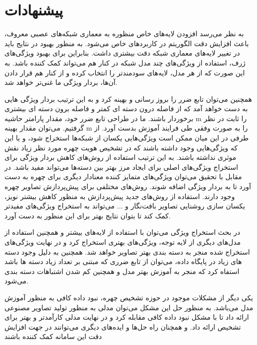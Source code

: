 \section{پیشنهادات}
به نظر می‌رسد افزودن لایه‌های خاص منظوره به معماری شبکه‌های عصبی معروف‌‌، باعث افزایش دقت الگوریتم در کاربردهای خاص می‌شود. به منظور بهبود در نتایج باید در تغییر لایه‌های معماری شبکه دقت بیشتری داشت. بنابراین برای بهبود ویژگی‌های ژرف، استفاده از ویژگی‌های چند مدل شبکه در کنار هم می‌تواند کمک کننده باشد. به این صورت که از هر مدل، لایه‌های سودمندتر را انتخاب کرده و از کنار هم قرار دادن آن‌ها، بردار ویژگی ما غنی‌تر خواهد شد. 

همچنین می‌توان تابع ضرر را بروز رسانی و بهینه ‌کرد و به این ترتیب بردار ویژگی هایی به دست خواهد آمد که از فاصله درون دسته ای کمتر و فاصله برون دسته ای بیشتری برخوردار باشند. ما در طراحی تابع ضرر خود، مقدار پارامتر حاشیه m را ثابت در نظر گرفتیم. می‌توان مقدار بهینه m را به صورت وفقی  طی فرایند آموزش بدست آورد. از طرفی در این میان ممکن است ویژگی‌هایی یکسان از شبکه‌ها استخراج شود، و یا این که ویژگی‌هایی وجود داشته باشند که در تشخیص هویت چهره مورد نظر زیاد نقش موثری نداشته باشند. به این ترتیب استفاده از روش‌های کاهش بردار ویژگی برای استخراج ویژگی‌های اصلی برای ایجاد مرز بهتر بین دسته‌ها‌ می‌تواند مفید باشد.
\noindent
در مقابل با تحقیق می‌توان ویژگی‌های متمایز کننده معنادار دیگری برای چهره به دست آورد تا به بردار ویژگی اضافه شوند. روش‌های مختلفی برای پیش‌پردازش تصاویر چهره وجود دارند. استفاده از روش‌های جدید پیش‌پردازش به منظور کاهش بیشتر نویز، یکسان‌ سازی روشنایی تصاویر بافت‌نگار و ... می‌تواند به استخراج ویژگی‌های مفیدتر کمک کند تا بتوان نتایج بهتر برای این منظور به دست آورد.

در بحث استخراج ویژگی می‌توان با استفاده از لایه‌های بیشتر و همچنین استفاده از مدل‌های دیگری از لایه توجه، ویژگی‌های بهتری استخراج كرد و در نهایت ویژگی‌های استخراج شده منجر به دسته بندی بهتر تصاویر خواهد شد. همچنین به دلیل وجود دسته های زیاد در پایگاه داده، می‌توان از تابع ضرری كه مبتنی بر تعداد زیاد دسته ها باشد استفاه كرد كه منجر به آموزش بهتر مدل و همچنین كم شدن اشتباهات دسته بندی می‌شود.

یكی دیگر از مشكلات موجود در حوزه تشخیص چهره، نبود داده كافی به منظور آموزش مدل می‌باشد. به منظور حل این مشكل می‌توان مدلی به منظور تولید تصاویر مصنوعی ارائه داد تا با مشكل نبود داده كافی مقابله كرد و در نهایت مدلی كارآمدتر و بهتر برای تشخیص ارائه داد. و همچنان راه حل‌ها و ایده‌های دیگری می‌توانند در جهت افزایش دقت این سامانه کمک کننده باشند